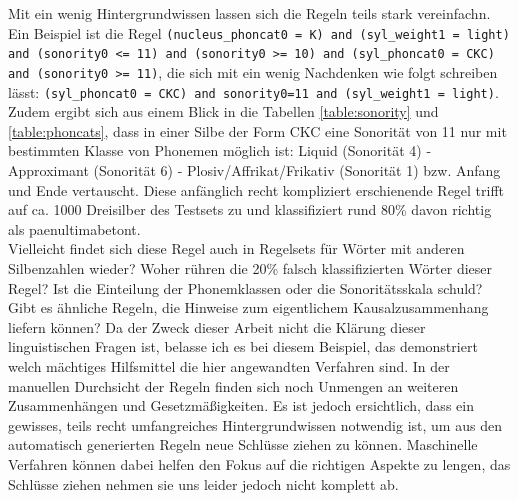 Mit ein wenig Hintergrundwissen lassen sich die Regeln teils stark vereinfachn. Ein Beispiel ist die Regel \texttt{(nucleus\_phoncat0 = K) and (syl\_weight1 = light) and (sonority0 \textless= 11) and (sonority0 \textgreater= 10) and (syl\_phoncat0 = CKC) and (sonority0 \textgreater= 11)}, die sich mit ein wenig Nachdenken wie folgt schreiben lässt: \texttt{(syl\_phoncat0 = CKC) and sonority0=11 and (syl\_weight1 = light)}. Zudem ergibt sich aus einem Blick in die Tabellen \ref{table:sonority} und \ref{table:phoncats}, dass in einer Silbe der Form CKC eine Sonorität von 11 nur mit bestimmten Klasse von Phonemen möglich ist: Liquid (Sonorität 4) - Approximant (Sonorität 6) - Plosiv/Affrikat/Frikativ (Sonorität 1) bzw. Anfang und Ende vertauscht. Diese anfänglich recht kompliziert erschienende Regel trifft auf ca. 1000 Dreisilber des Testsets zu und klassifiziert rund 80\% davon richtig als paenultimabetont.\\
Vielleicht findet sich diese Regel auch in Regelsets für Wörter mit anderen Silbenzahlen wieder? Woher rühren die 20\% falsch klassifizierten Wörter dieser Regel? Ist die Einteilung der Phonemklassen oder die Sonoritätsskala schuld? Gibt es ähnliche Regeln, die Hinweise zum eigentlichem Kausalzusammenhang liefern können? Da der Zweck dieser Arbeit nicht die Klärung dieser linguistischen Fragen ist, belasse ich es bei diesem Beispiel, das demonstriert welch mächtiges Hilfsmittel die hier angewandten Verfahren sind. In der manuellen Durchsicht der Regeln finden sich noch Unmengen an weiteren Zusammenhängen und Gesetzmäßigkeiten. Es ist jedoch ersichtlich, dass ein gewisses, teils recht umfangreiches Hintergrundwissen notwendig ist, um aus den automatisch generierten Regeln neue Schlüsse ziehen zu können. Maschinelle Verfahren können dabei helfen den Fokus auf die richtigen Aspekte zu lengen, das Schlüsse ziehen nehmen sie uns leider jedoch nicht komplett ab.
\label{rule_simplify}





